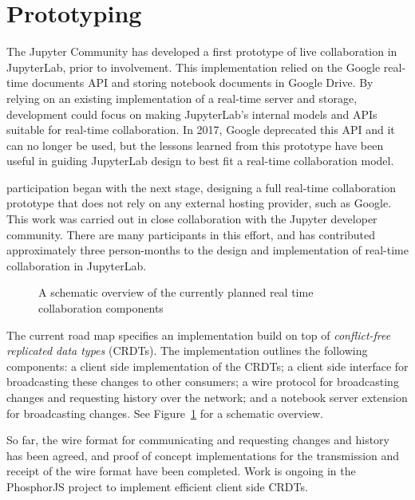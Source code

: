 \documentclass{deliverablereport}
\begin{document}

\section{Prototyping}

The Jupyter Community has developed a first prototype of live collaboration in JupyterLab,
prior to \ODK involvement.
This implementation relied on the Google real-time documents API and storing notebook documents in Google Drive.
By relying on an existing implementation of a real-time server and storage,
development could focus on making JupyterLab's
internal models and APIs suitable for real-time collaboration.
In 2017, Google deprecated this API and it can no longer be used,
but the lessons learned from this prototype have been useful in guiding JupyterLab design to best fit a real-time collaboration model.

\ODK participation began with the next stage, designing a full real-time collaboration prototype
that does not rely on any external hosting provider,
such as Google.
This work was carried out in close collaboration with the Jupyter developer community.
There are many participants in this effort, and \ODK has contributed approximately
three person-months to the design and implementation of real-time collaboration in JupyterLab.


\begin{figure}[h]
  \centering
  \caption{A schematic overview of the currently planned real time collaboration components}
  \label{fig:rtc-components}
\end{figure}

The current road map specifies an implementation build on top of
\emph{conflict-free replicated data types} (CRDTs). The implementation outlines the
following components: a client side implementation of the CRDTs; a client side interface
for broadcasting these changes to other consumers; a wire protocol for broadcasting
changes and requesting history over the network; and a notebook server extension for broadcasting changes. See Figure~\ref{fig:rtc-components} for a schematic overview.

So far, the wire format for communicating and requesting changes and history has been
agreed, and proof of concept implementations for the transmission and receipt of the
wire format have been completed. Work is ongoing in the PhosphorJS project to implement
efficient client side CRDTs.
\end{document}
